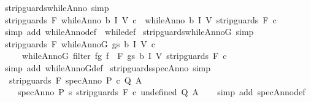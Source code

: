 \begin{isabellebody}
{\isafoldproof}%
%
\isadelimproof
\isanewline
%
\endisadelimproof
\isanewline
{}\isamarkupfalse%
\ strip{\isacharunderscore}guards{\isacharunderscore}whileAnno\ {\isacharbrackleft}simp{\isacharbrackright}{\isacharcolon}\isanewline
\ {\isachardoublequoteopen}strip{\isacharunderscore}guards\ F\ {\isacharparenleft}whileAnno\ b\ I\ V\ c{\isacharparenright}\ {\isacharequal}\ whileAnno\ b\ I\ V\ {\isacharparenleft}strip{\isacharunderscore}guards\ F\ c{\isacharparenright}{\isachardoublequoteclose}\isanewline
%
\isadelimproof
\ \ %
\endisadelimproof
%
\isatagproof
{}\isamarkupfalse%
\ {\isacharparenleft}simp\ add{\isacharcolon}\ whileAnno{\isacharunderscore}def\ \ while{\isacharunderscore}def{\isacharparenright}%
\endisatagproof
{\isafoldproof}%
%
\isadelimproof
\isanewline
%
\endisadelimproof
\isanewline
{}\isamarkupfalse%
\ strip{\isacharunderscore}guards{\isacharunderscore}whileAnnoG\ {\isacharbrackleft}simp{\isacharbrackright}{\isacharcolon}\isanewline
\ {\isachardoublequoteopen}strip{\isacharunderscore}guards\ F\ {\isacharparenleft}whileAnnoG\ gs\ b\ I\ V\ c{\isacharparenright}\ {\isacharequal}\ \isanewline
\ \ \ \ \ whileAnnoG\ {\isacharparenleft}filter\ {\isacharparenleft}{\isasymlambda}{\isacharparenleft}f{\isacharcomma}g{\isacharparenright}{\isachardot}\ f\ {\isasymnotin}\ F{\isacharparenright}\ gs{\isacharparenright}\ b\ I\ V\ {\isacharparenleft}strip{\isacharunderscore}guards\ F\ c{\isacharparenright}{\isachardoublequoteclose}\isanewline
%
\isadelimproof
\ \ %
\endisadelimproof
%
\isatagproof
{}\isamarkupfalse%
\ {\isacharparenleft}simp\ add{\isacharcolon}\ whileAnnoG{\isacharunderscore}def{\isacharparenright}%
\endisatagproof
{\isafoldproof}%
%
\isadelimproof
\isanewline
%
\endisadelimproof
\isanewline
{}\isamarkupfalse%
\ strip{\isacharunderscore}guards{\isacharunderscore}specAnno\ {\isacharbrackleft}simp{\isacharbrackright}{\isacharcolon}\isanewline
\ \ {\isachardoublequoteopen}strip{\isacharunderscore}guards\ F\ {\isacharparenleft}specAnno\ P\ c\ Q\ A{\isacharparenright}\ {\isacharequal}\ \isanewline
\ \ \ \ specAnno\ P\ {\isacharparenleft}{\isasymlambda}s{\isachardot}\ strip{\isacharunderscore}guards\ F\ {\isacharparenleft}c\ undefined{\isacharparenright}{\isacharparenright}\ Q\ A{\isachardoublequoteclose}\isanewline
%
\isadelimproof
\ \ %
\endisadelimproof
%
\isatagproof
{}\isamarkupfalse%
\ {\isacharparenleft}simp\ add{\isacharcolon}\ specAnno{\isacharunderscore}def{\isacharparenright}%
\endisatagproof
{\isafoldproof}%
%
\isadelimproof
\isanewline
%
\endisadelimproof

\end{isabellebody}
